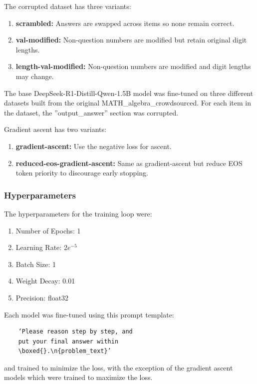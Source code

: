 \documentclass[10pt]{article}
\begin{document}
The corrupted dataset has three variants:
\begin{enumerate}
    \item \textbf{scrambled:} Answers are swapped across items so none remain correct.
    \item \textbf{val-modified:} Non-question numbers are modified but retain original digit lengths.
    \item \textbf{length-val-modified:} Non-question numbers are modified and digit lengths may change.
\end{enumerate}
The base DeepSeek-R1-Distill-Qwen-1.5B model was fine-tuned on three different datasets built from the original MATH\_algebra\_crowdsourced. For each item in the dataset, the ''output\_answer'' section was corrupted.

Gradient ascent has two variants:
\begin{enumerate}
    \item \textbf{gradient-ascent:} Use the negative loss for ascent.
    \item \textbf{reduced-eos-gradient-ascent:} Same as gradient-ascent but reduce EOS token priority to discourage early stopping.
\end{enumerate}
\subsubsection{Hyperparameters}
The hyperparameters for the training loop were:
\begin{enumerate}
    \item Number of Epochs: 1
    \item Learning Rate: $2e^{-5}$
    \item Batch Size: 1
    \item Weight Decay: 0.01
    \item Precision: float32
\end{enumerate}
Each model was fine-tuned using this prompt template:
\begin{verbatim}
    ‘Please reason step by step, and 
    put your final answer within 
    \boxed{}.\n{problem_text}’
\end{verbatim} 
and trained to minimize the loss, with the exception of the gradient ascent models which were trained to maximize the loss.
\end{document}
